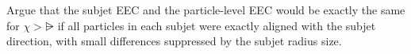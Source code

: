 \begin{exercise}
    Argue that the subjet EEC and the particle-level EEC would be exactly the same for \(\chi > \rsub\) if all particles in each subjet were exactly aligned with the subjet direction, with small differences suppressed by the subjet radius size.
\end{exercise}



\begin{figure}
    \centering
    \hspace{9em}
\end{figure}
